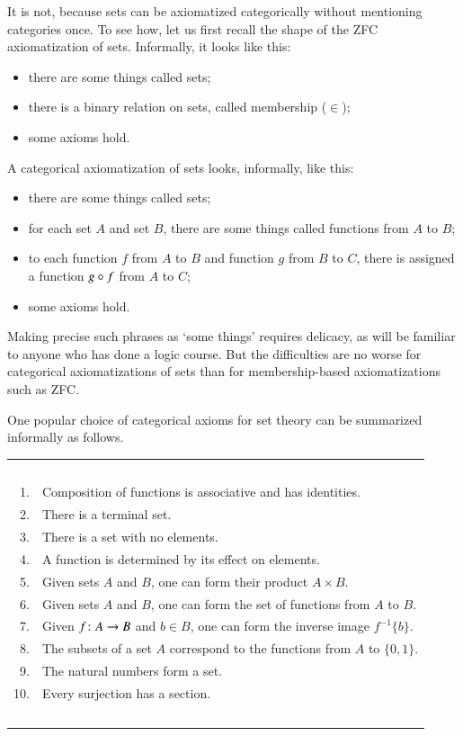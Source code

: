 It is not, because sets can be axiomatized categorically without mentioning
categories once.  To see how, let us first recall the shape of the ZFC
axiomatization of sets.  Informally, it looks like this:
%
\begin{itemize}
\item
there are some things called sets;

\item
there is a binary relation on sets, called membership ($\in$);

\item
some axioms hold.
\end{itemize}
%
A categorical axiomatization of sets looks, informally, like this:
%
\begin{itemize}
\item
there are some things called sets;

\item
for each set $A$ and set $B$, there are some things called functions from
$A$ to $B$;

\item
to each function $f$ from $A$ to $B$ and function $g$ from $B$ to $C$,
there is assigned a function $g\mathbin{\circ} f$ from $A$ to $C$;

\item
some axioms hold.
\end{itemize}
%
Making precise such phrases as `some things' requires delicacy, as will be
familiar to anyone who has done a logic course.  But the difficulties are
no worse for categorical axiomatizations of sets than for membership-based
axiomatizations such as ZFC.

One popular choice of categorical axioms for set theory can be summarized
informally as follows.

\begin{tabular}{@{}r@{\ \ }l}
\ \\
1. &Composition of functions is associative and has identities.\\
2. &There is a terminal set.\\
3. &There is a set with no elements.\\
4. &A function is determined by its effect on elements.\\
5. &Given sets $A$ and $B$, one can form their product $A \times B$.\\
6. &Given sets $A$ and $B$, one can form the set of functions from $A$ to
$B$.\\
7. &Given $f\from A \to B$ and $b \in B$, one can form the inverse image
$f^{-1}\{b\}$.\\
8. &The subsets of a set $A$ correspond to the functions from $A$ to $\{0,
1\}$.\\
9. &The natural numbers form a set.\\
10. &Every surjection has a section.\\
\ \\
\end{tabular}

